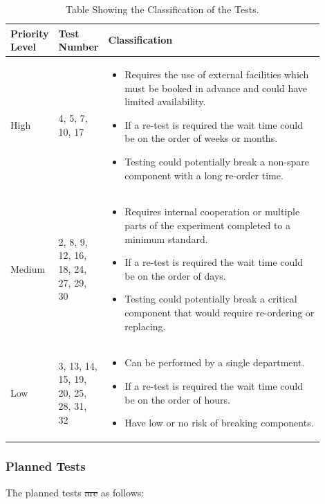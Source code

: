 \documentclass[a4paper,12pt,oneside]{article}
\providecommand{\DIFaddtex}[1]{{\protect\color{blue}\uwave{#1}}} %
\providecommand{\DIFdeltex}[1]{{\protect\color{red}\sout{#1}}}                      %
\providecommand{\DIFaddbegin}{} %
\providecommand{\DIFaddend}{} %
\providecommand{\DIFdelbegin}{} %
\providecommand{\DIFdelend}{} %
\providecommand{\DIFadd}[1]{\texorpdfstring{\DIFaddtex{#1}}{#1}} %
\providecommand{\DIFdel}[1]{\texorpdfstring{\DIFdeltex{#1}}{}} %
\newcommand{\DIFscaledelfig}{0.5}
\newlength{\DIFdelgraphicswidth} %
\newlength{\DIFdelgraphicsheight} %
\newcommand{\DIFaddincludegraphics}[2][]{{\color{blue}\fbox{\DIFOincludegraphics[#1]{#2}}}} %
\newcommand{\DIFdelincludegraphics}[2][]{%
\sbox{\DIFdelgraphicsbox}{\DIFOincludegraphics[#1]{#2}}%
\settoboxwidth{\DIFdelgraphicswidth}{\DIFdelgraphicsbox} %
\settoboxtotalheight{\DIFdelgraphicsheight}{\DIFdelgraphicsbox} %
\scalebox{\DIFscaledelfig}{%
\parbox[b]{\DIFdelgraphicswidth}{\usebox{\DIFdelgraphicsbox}\\[-\baselineskip] \rule{\DIFdelgraphicswidth}{0em}}\llap{\resizebox{\DIFdelgraphicswidth}{\DIFdelgraphicsheight}{%
\setlength{\unitlength}{\DIFdelgraphicswidth}%
\begin{picture}(1,1)%
\thicklines\linethickness{2pt} %
{\color[rgb]{1,0,0}\put(0,0){\framebox(1,1){}}}%
{\color[rgb]{1,0,0}\put(0,0){\line( 1,1){1}}}%
{\color[rgb]{1,0,0}\put(0,1){\line(1,-1){1}}}%
\end{picture}%
}\hspace*{3pt}}} %
} %
\DeclareRobustCommand{\DIFaddbegin}{\DIFOaddbegin \let\includegraphics\DIFaddincludegraphics} %
\DeclareRobustCommand{\DIFaddend}{\DIFOaddend \let\includegraphics\DIFOincludegraphics} %
\DeclareRobustCommand{\DIFdelbegin}{\DIFOdelbegin \let\includegraphics\DIFdelincludegraphics} %
\DeclareRobustCommand{\DIFdelend}{\DIFOaddend \let\includegraphics\DIFOincludegraphics} %
\begin{document}
\begin{table}[H]
\centering
\begin{tabular}{|p{0.1\linewidth}|p{0.1\linewidth}|p{0.7\linewidth}|}
\hline
\textbf{Priority Level} & \textbf{Test Number} & \textbf{Classification} \\ \hline
High & 4, 5, 7, 10, 17 & \begin{itemize}
    \item Requires the use of external facilities which must be booked in advance and could have limited availability.
    \item If a re-test is required the wait time could be on the order of weeks or months.
    \item Testing could potentially break a non-spare component with a long re-order time.
\end{itemize}\\ \hline
Medium & 2, 8, 9, 12, 16, 18, 24, 27, 29, 30 & \begin{itemize}
    \item Requires internal cooperation or multiple parts of the experiment completed to a minimum standard.
    \item If a re-test is required the wait time could be on the order of days.
    \item Testing could potentially break a critical component that would require re-ordering or replacing.
\end{itemize} \\ \hline
Low & 3, 13, 14, 15, 19, 20, 25, 28, 31, 32 & \begin{itemize}
    \item Can be performed by a single department.
    \item If a re-test is required the wait time could be on the order of hours.
    \item Have low or no risk of breaking components.
\end{itemize} \\ \hline
\end{tabular}
\caption{Table Showing the Classification of the Tests.}
\label{tab:classification}
\end{table}

\raggedbottom

\subsubsection{Planned Tests}
The planned tests \DIFdelbegin \DIFdel{are }\DIFdelend \DIFaddbegin \DIFadd{were }\DIFaddend as follows:
\end{document}

